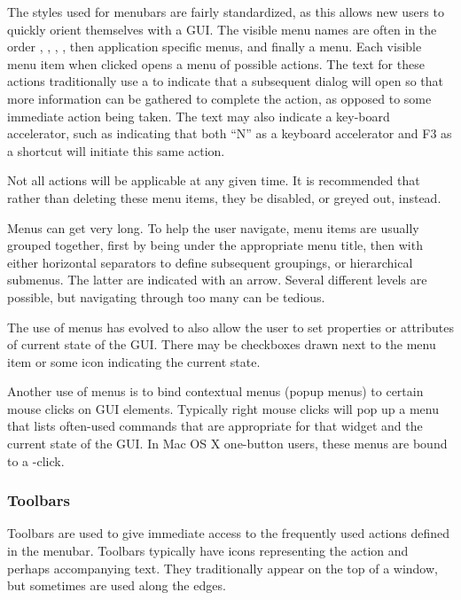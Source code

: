 The styles used for menubars are fairly standardized, as this allows
new users to quickly orient themselves with a GUI. The visible menu
names are often in the order , , ,
, then application specific menus, and finally a
 menu. Each visible menu item when clicked opens a menu of
possible actions. The text for these actions traditionally use a
  to indicate that a subsequent dialog will open so that
more information can be gathered to complete the action, as opposed to
some immediate action being taken. The text may also indicate a
key-board accelerator, such as 
indicating that both ``N'' as a keyboard accelerator and F3 as a
shortcut will initiate this same action.

Not all actions will be applicable at any given time. It is
recommended that rather than deleting these menu items, they be
disabled, or greyed out, instead. %

Menus can get very long. To help the user navigate, menu items are usually
grouped together, first by being under the appropriate menu title,
then with either horizontal separators to define subsequent groupings,
or hierarchical submenus. The latter are indicated with an
arrow. Several different levels are possible, but navigating through
too many can be tedious.

The use of menus has evolved to also allow the user to set properties
or attributes of current state of the GUI. There may be checkboxes
drawn next to the menu item or some icon indicating the current state.

Another use of menus is to bind contextual menus (popup menus) to
certain mouse clicks on GUI elements. Typically right mouse clicks
will pop up a menu that lists often-used commands that are appropriate
for that widget and the current state of the GUI. In Mac OS X
one-button users, these menus are bound to a -click.

\subsubsection{Toolbars}
\label{sec:GUI:toolbars}

Toolbars are used to give immediate access to the frequently used actions
defined in the menubar. Toolbars typically have icons representing the
action and perhaps accompanying text. They traditionally appear on the
top of a window, but sometimes are used along the edges. 


